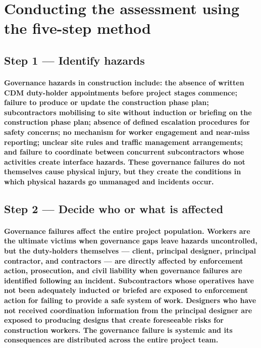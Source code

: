 \section{Conducting the assessment using the five-step method}

\subsection{Step 1 --- Identify hazards}
\paragraph{Governance hazards in construction include: the absence of written CDM duty-holder appointments before project stages commence; failure to produce or update the construction phase plan; subcontractors mobilising to site without induction or briefing on the construction phase plan; absence of defined escalation procedures for safety concerns; no mechanism for worker engagement and near-miss reporting; unclear site rules and traffic management arrangements; and failure to coordinate between concurrent subcontractors whose activities create interface hazards. These governance failures do not themselves cause physical injury, but they create the conditions in which physical hazards go unmanaged and incidents occur.}

\subsection{Step 2 --- Decide who or what is affected}
\paragraph{Governance failures affect the entire project population. Workers are the ultimate victims when governance gaps leave hazards uncontrolled, but the duty-holders themselves --- client, principal designer, principal contractor, and contractors --- are directly affected by enforcement action, prosecution, and civil liability when governance failures are identified following an incident. Subcontractors whose operatives have not been adequately inducted or briefed are exposed to enforcement action for failing to provide a safe system of work. Designers who have not received coordination information from the principal designer are exposed to producing designs that create foreseeable risks for construction workers. The governance failure is systemic and its consequences are distributed across the entire project team.}

